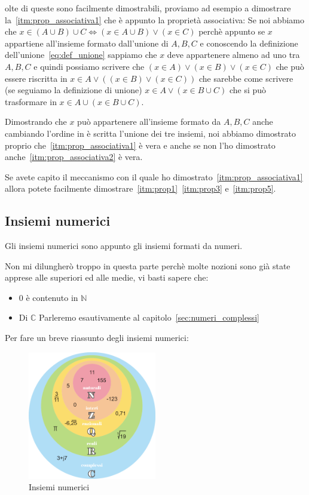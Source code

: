 \documentclass{article}
\theoremstyle{definition}
\begin{document}
olte di queste sono facilmente dimostrabili, proviamo ad esempio a dimostrare la~\ref{itm:prop_associativa1} che è appunto la proprietà associativa: \newline
Se noi abbiamo che $x \in (A \cup B) \cup C \Leftrightarrow (x \in A \cup B) \lor (x \in C)$ perchè appunto se $x$ appartiene all'insieme formato dall'unione di $A,B,C$ e conoscendo la definizione dell'unione~\ref{eq:def_unione}  sappiamo che $x$ deve appartenere almeno ad uno tra $A,B,C$ e quindi possiamo scrivere che $(x \in A) \lor (x \in B) \lor (x \in C)$ che può essere riscritta in $x \in A \lor ((x \in B) \lor (x \in C))$ che sarebbe come scrivere (se seguiamo la definizione di unione) $x \in A \lor (x \in B \cup C)$ che si può trasformare in $x \in A \cup (x \in B \cup C)$. \par
Dimostrando che $x$ può appartenere all'insieme formato da $A,B,C$ anche cambiando l'ordine in è scritta l'unione dei tre insiemi, noi abbiamo dimostrato proprio che~\ref{itm:prop_associativa1} è vera e anche se non l'ho dimostrato anche~\ref{itm:prop_associativa2} è vera.\par
Se avete capito il meccanismo con il quale ho dimostrato~\ref{itm:prop_associativa1} allora potete facilmente dimostrare~\ref{itm:prop1}~\ref{itm:prop3} e~\ref{itm:prop5}.



\subsection{Insiemi numerici}
Gli insiemi numerici sono appunto gli insiemi formati da numeri. \par
Non mi dilungherò troppo in questa parte perchè molte nozioni sono già state apprese alle superiori ed alle medie, vi basti sapere che:
\begin{itemize}
        \item $0$ è contenuto in $\mathbb{N}$
        \item Di $\mathbb{C}$ Parleremo esautivamente al capitolo~\ref{sec:numeri_complessi} 
\end{itemize}

Per fare un breve riassunto degli insiemi numerici:
\begin{figure}[h]
        \centering
                \includegraphics[width=0.5\textwidth]{insiemi_numerici.png}
        \caption{Insiemi numerici}\label{fig:insiemi_numerici}
\end{figure}
\end{document}
